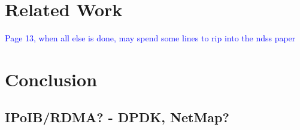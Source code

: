 \section{Related Work}
\textcolor{blue}{Page 13, when all else is done, may spend some lines to rip into the ndss paper}
\section{Conclusion}
\subsection{IPoIB/RDMA? - DPDK, NetMap?}